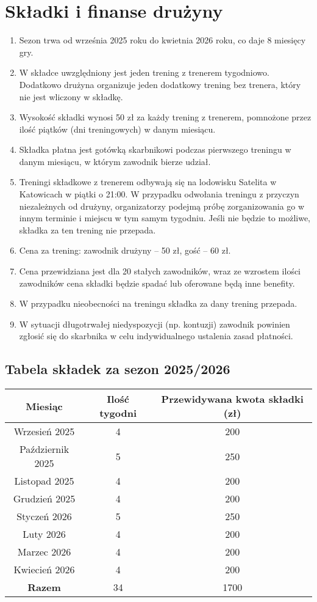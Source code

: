\documentclass[12pt,a4paper]{article}
\let\stdsection\section
\renewcommand\section{\clearpage\stdsection}
\begin{document}
\section{Składki i finanse drużyny}
\begin{enumerate}
  \item Sezon trwa od września 2025 roku do kwietnia 2026 roku, co daje 8 miesięcy gry.
  \item W składce uwzględniony jest jeden trening z trenerem tygodniowo. Dodatkowo drużyna organizuje jeden dodatkowy trening bez trenera, który nie jest wliczony w składkę.
  \item Wysokość składki wynosi 50 zł za każdy trening z trenerem, pomnożone przez ilość piątków (dni treningowych) w danym miesiącu.
  \item Składka płatna jest gotówką skarbnikowi podczas pierwszego treningu w danym miesiącu, w którym zawodnik bierze udział.
  \item Treningi składkowe z trenerem odbywają się na lodowisku Satelita w Katowicach w piątki o 21:00. W przypadku odwołania treningu z przyczyn niezależnych od drużyny, organizatorzy podejmą próbę zorganizowania go w innym terminie i miejscu w tym samym tygodniu. Jeśli nie będzie to możliwe, składka za ten trening nie przepada.
  \item Cena za trening: zawodnik drużyny -- 50 zł, gość -- 60 zł.
  \item Cena przewidziana jest dla 20 stałych zawodników, wraz ze wzrostem ilości zawodników cena składki będzie spadać lub oferowane będą inne benefity.
  \item W przypadku nieobecności na treningu składka za dany trening przepada.
  \item W sytuacji długotrwałej niedyspozycji (np. kontuzji) zawodnik powinien zgłosić się do skarbnika w celu indywidualnego ustalenia zasad płatności.
\end{enumerate}

\subsection{Tabela składek za sezon 2025/2026}
\begin{center}
\begin{tabular}{ |c|c|c| } 
 \hline
 Miesiąc & Ilość tygodni & Przewidywana kwota składki (zł) \\ 
 \hline
 Wrzesień 2025 & 4 & 200 \\ 
 Październik 2025 & 5 & 250 \\ 
 Listopad 2025 & 4 & 200 \\ 
 Grudzień 2025 & 4 & 200 \\ 
 Styczeń 2026 & 5 & 250 \\ 
 Luty 2026 & 4 & 200 \\ 
 Marzec 2026 & 4 & 200 \\ 
 Kwiecień 2026 & 4 & 200 \\ 
 \hline
 \textbf{Razem} & 34 & 1700 \\ 
 \hline
\end{tabular}
\end{center}
\end{document}
